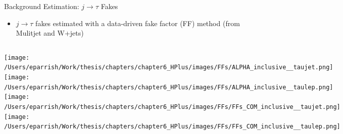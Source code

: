 \documentclass[aspectratio=169,xcolor=table]{beamer}
\begin{document}
\begin{frame}[t]{Background Estimation: $j \rightarrow \tau$ Fakes}
      \begin{itemize}
        \item $j \rightarrow \tau$ fakes estimated with a data-driven fake factor (FF) method (from Mulitjet and W+jets)
        \begin{itemize}
        \end{itemize}
      \end{itemize}

      \begin{columns}
        \centering
          \texttt{[image: /Users/eparrish/Work/thesis/chapters/chapter6\_HPlus/images/FFs/ALPHA\_inclusive\_\_taujet.png]}
        \centering
          \texttt{[image: /Users/eparrish/Work/thesis/chapters/chapter6\_HPlus/images/FFs/ALPHA\_inclusive\_\_taulep.png]}
        \centering
          \texttt{[image: /Users/eparrish/Work/thesis/chapters/chapter6\_HPlus/images/FFs/FFs\_COM\_inclusive\_\_taujet.png]}
        \centering
          \texttt{[image: /Users/eparrish/Work/thesis/chapters/chapter6\_HPlus/images/FFs/FFs\_COM\_inclusive\_\_taulep.png]}
      \end{columns}
    \end{frame}
\end{document}
